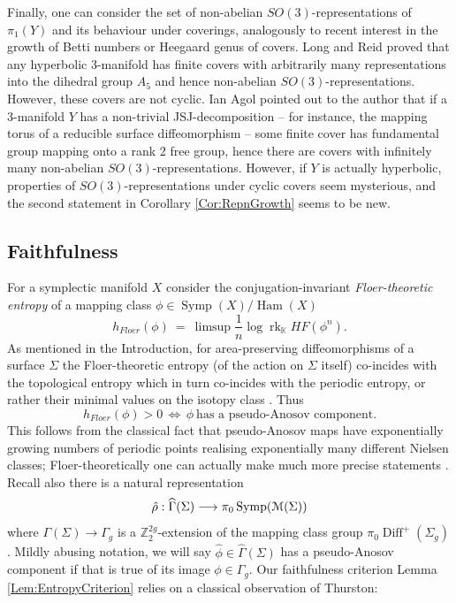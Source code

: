\documentclass[reqno,10pt]{amsart}
\numberwithin{equation}{section}
\newcommand{\bK}{{\mathbb K}}
\newcommand{\bZ}{{\mathbb Z}}
\newcommand{\scrM}{\EuScript{M}}
\newcommand{\rk}{\operatorname{rk}}
\newcommand{\Symp}{\operatorname{Symp}}
\newcommand{\Diff}{\operatorname{Diff}}
\newcommand{\Ham}{\operatorname{Ham}}
\theoremstyle{remark}
\begin{document}
 Finally, one can consider the set of non-abelian $SO(3)$-representations of $\pi_1(Y)$ and its behaviour under coverings, analogously to recent interest in the growth of Betti numbers or Heegaard genus of covers.  Long and Reid \cite{LongReid} proved that any hyperbolic 3-manifold has finite covers with arbitrarily many representations into the dihedral group $A_5$ and hence non-abelian $SO(3)$-representations. However, these covers are not cyclic.  Ian Agol pointed out to the author that if a 3-manifold $Y$ has a non-trivial JSJ-decomposition -- for instance, the mapping torus of a reducible surface diffeomorphism --  some finite cover has fundamental group mapping onto a rank 2 free group, hence there are covers with infinitely many non-abelian $SO(3)$-representations. However, if $Y$ is actually hyperbolic, properties of $SO(3)$-representations under cyclic covers seem mysterious, and the second statement in Corollary \ref{Cor:RepnGrowth} seems to be new. 


\subsection{Faithfulness}\label{Sec:Faithful}

For a symplectic manifold $X$  consider the conjugation-invariant \emph{Floer-theoretic entropy} of  a mapping class $\phi \in \Symp(X)/\Ham(X)$ 
\[ 
h_{Floer}(\phi) \ = \ \limsup \frac{1}{n} \log \rk_{\bK} HF(\phi^n).
\]
As mentioned in the Introduction, for area-preserving diffeomorphisms of a surface $\Sigma$ the Floer-theoretic entropy (of the action on $\Sigma$ itself) co-incides with the topological entropy which in turn co-incides with the periodic entropy, or rather their minimal values on the isotopy class \cite{Cotton-Clay,FLP, Felshtyn}. Thus 
\begin{equation} \label{Eqn:PosEntropy}
h_{Floer}(\phi)>0 \, \Leftrightarrow \, \phi \ \textrm{has a pseudo-Anosov component.}
\end{equation}
This follows from the classical fact that pseudo-Anosov maps have exponentially growing numbers of periodic points realising exponentially many different Nielsen classes;  Floer-theoretically one can actually make much more precise statements \cite{Cotton-Clay}.  Recall also there is a natural representation
\[
\hat\rho: \widehat{\Gamma}(\Sigma) \longrightarrow \pi_0\Symp(\scrM(\Sigma))
\]
where $\Gamma(\Sigma) \rightarrow \Gamma_g$ is a $\bZ_2^{2g}$-extension of the mapping class group $\pi_0\Diff^+(\Sigma_g)$. Mildly abusing notation, we will say $\hat\phi \in \widehat{\Gamma}(\Sigma)$ has a pseudo-Anosov component  if that is true of its image $\phi \in \Gamma_g$.  Our faithfulness criterion Lemma \ref{Lem:EntropyCriterion} relies on a classical observation of Thurston:
\end{document}
